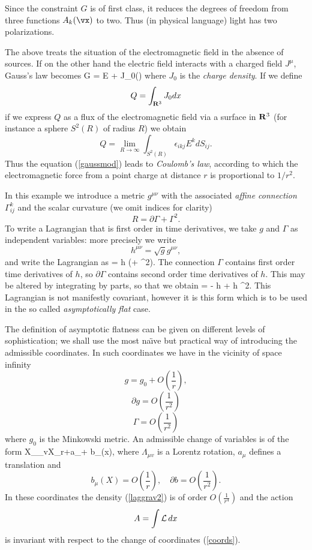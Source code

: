 Since the constraint $G$ is  of first class, it reduces the degrees
of freedom from three functions $A_k(\vx)$ to two. Thus
(in physical language) light has two polarizations. 



The above treats the situation of the electromagnetic field in the 
absence of sources. If on the other hand the electric field 
interacts with a charged field $J^\mu$, Gauss's law becomes  
\beq \label{gaussmod}  G = \nabla \cdot E + J_0(\vx) \eeq
where $J_0 $ is the {\em charge density}. If we define
$$ Q = \int_{{{\bf R }}^3}  J_0 dx $$ 
if we express $Q$ as a flux of the electromagnetic field 
via a  surface in ${{\bf R }}^3$ (for instance a sphere $S^2(R)$ of 
radius $R$) 
we obtain 
$$ Q = \lim_{R \to \infty} \int_{S^2(R)} \epsilon_{ikj }
E^k dS_{ij}. $$
Thus the equation 
(\ref{gaussmod})   leads to {\em Coulomb's law}, 
according to which the electromagnetic force from a point
charge  at distance $r$ is proportional to 
$1/r^2$. 




In this example we introduce a metric $g^{\mu \nu}$ with the associated
{\em affine connection} $\Gamma_{ij}^k$ and the scalar curvature 
(we omit indices for clarity)
$$ R = \partial  \Gamma + \Gamma^2. $$
To write  a Lagrangian that is  first order in time derivatives, 
we take $g$ and $\Gamma$ as independent variables: more precisely we write
$$ h ^{\mu \nu} = \sqrt{g} g^{\mu \nu},$$  and write the Lagrangian as 
\beq \label{laggrav1} \calL = h (\partial \Gamma + \Gamma^2). \eeq
The connection $\Gamma$ contains first order time derivatives of $h$, so 
$\partial \Gamma$ contains second order time derivatives of $h$. 
This may be altered by integrating by parts, so that we obtain
\beq \label{laggrav2}
\calL = - \Gamma \partial h + h \Gamma^2. \eeq
This Lagrangian is not manifestly  covariant, however it is  this
form which is to be 
used in the so called {\em asymptotically flat} case. 

The definition of asymptotic flatness can be given on different levels of 
sophistication; we shall use the most na\"{\i}ve but practical 
way of introducing the admissible coordinates. In such 
coordinates we have in  the vicinity of space infinity 
$$ g = g_0 + O (\frac{1}{r} ), $$ 
$$ \partial g = O (\frac{1}{r^2} )$$ 
$$\Gamma  = O (\frac{1}{r^2}) $$
where $g_0$ is the Minkowski metric. 
An admissible change of variables is of the form
\beq \label{coords}
X_\mu\to \Lambda_{\mu v}X_r+a_\mu+
b_\mu(x),
\eeq
where $\Lambda_{\mu v}$ is a Lorentz rotation, $a_\mu$
defines  a translation  and
$$
b_\mu(X)= O\left(\frac{1}{r} \right),\quad
\partial b=O\left(\frac{1}{r^2}\right).
$$
In these coordinates the density (\ref{laggrav2}) is of
order $O\left(\frac{1}{r^4}\right)$ and the action
$$
A=\int{\mbox{$\cal L$}}\,dx
$$
is invariant with respect to the change of coordinates
(\ref{coords}).

